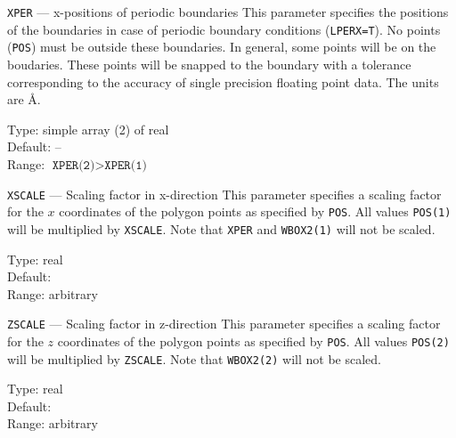 \begin{keydescription}{\texttt{XPER} --- x-positions of periodic boundaries}
%
  This parameter specifies the positions of the boundaries in case of 
  periodic boundary conditions (\texttt{LPERX=T}). No points (\texttt{POS}) 
  must be outside these boundaries. In general, some points will be on the
  boudaries. These points will be snapped to the boundary with a tolerance 
  corresponding to the accuracy of single precision floating point data.
  The units are \AA. 
  \begin{keytab}
    Type:    \> simple array (2) of real \\
    Default: \> -- \\
    Range:   \> $\texttt{XPER(2)} > \texttt{XPER(1)}$
  \end{keytab}
\end{keydescription}

\begin{keydescription}{\texttt{XSCALE} --- Scaling factor in x-direction}
%
  This parameter specifies a scaling factor for the $x$ coordinates of the
  polygon points as specified by \texttt{POS}. All values \texttt{POS(1)} will
  be multiplied by \texttt{XSCALE}. Note that \texttt{XPER} and
  \texttt{WBOX2(1)} will not be scaled. 
  \begin{keytab}
    Type:    \> real \\
    Default:  \\
    Range:   \> arbitrary
  \end{keytab}
\end{keydescription}

\begin{keydescription}{\texttt{ZSCALE} --- Scaling factor in z-direction}
%
  This parameter specifies a scaling factor for the $z$ coordinates of the
  polygon points as specified by \texttt{POS}. All values \texttt{POS(2)}
  will be multiplied by \texttt{ZSCALE}. Note that \texttt{WBOX2(2)} will not be
  scaled.
  \begin{keytab}
    Type:    \> real \\
    Default:  \\
    Range:   \> arbitrary
  \end{keytab}
\end{keydescription}

